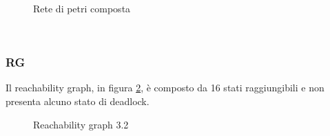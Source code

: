 \documentclass[a4paper]{article}
\begin{document}
\begin{figure}[!ht]
\centering
{}
\caption{Rete di petri composta} \label{FIG:3.2PN}
\end{figure}\\
\newpage
\subsubsection{RG}
Il reachability graph, in figura \ref{FIG:3.2RG}, è composto da 16 stati raggiungibili e non presenta alcuno stato di deadlock.
\begin{figure}[!ht]
\centering
{}
\caption{Reachability graph 3.2} \label{FIG:3.2RG}
\end{figure}
\newpage
\end{document}
